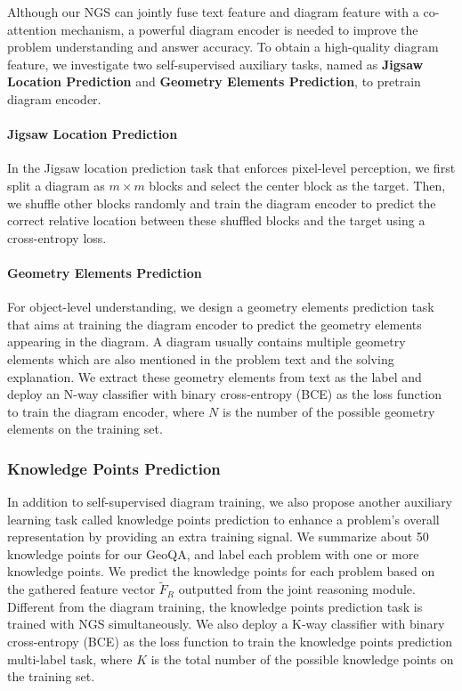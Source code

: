 \documentclass[11pt,a4paper]{article}
\begin{document}
Although our NGS can jointly fuse text feature and diagram feature with a co-attention mechanism, a powerful diagram encoder is needed to improve the problem understanding and answer accuracy. To obtain a high-quality diagram feature, we investigate two self-supervised auxiliary tasks, named as \textbf{Jigsaw Location Prediction} and \textbf{Geometry Elements Prediction}, to pretrain diagram encoder. 


\paragraph{Jigsaw Location Prediction}
In the Jigsaw location prediction task that enforces pixel-level perception, we first split a diagram as $m \times m$ blocks and select the center block as the target. Then, we shuffle other blocks randomly and train the diagram encoder to predict the correct relative location between these shuffled blocks and the target using a cross-entropy loss. 

\paragraph{Geometry Elements Prediction}
For object-level understanding, we design a geometry elements prediction task that aims at training the diagram encoder to predict the geometry elements appearing in the diagram. A diagram usually contains multiple geometry elements which are also mentioned in the problem text and the solving explanation. We extract these geometry elements from text as the label and deploy an N-way classifier with binary cross-entropy (BCE) as the loss function to train the diagram encoder, where $N$ is the number of the possible geometry elements on the training set. 


\subsubsection{Knowledge Points Prediction}
In addition to self-supervised diagram training, we also propose another auxiliary learning task called knowledge points prediction to enhance a problem's overall representation by providing an extra training signal. We summarize about 50 knowledge points for our GeoQA, and label each problem with one or more knowledge points. We predict the knowledge points for each problem based on the gathered feature vector $\tilde{F}_R$ outputted from the joint reasoning module. Different from the diagram training, the knowledge points prediction task is trained with NGS simultaneously. 
We also deploy a K-way classifier with binary cross-entropy (BCE) as the loss function to train the knowledge points prediction multi-label task, where $K$ is the total number of the possible knowledge points on the training set.
\end{document}
